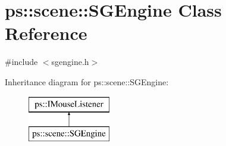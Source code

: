 \hypertarget{classps_1_1scene_1_1SGEngine}{}\section{ps\+:\+:scene\+:\+:S\+G\+Engine Class Reference}
\label{classps_1_1scene_1_1SGEngine}


{\ttfamily \#include $<$sgengine.\+h$>$}

Inheritance diagram for ps\+:\+:scene\+:\+:S\+G\+Engine\+:\begin{figure}[H]
\begin{center}
\leavevmode
\includegraphics[height=2.000000cm]{classps_1_1scene_1_1SGEngine}
\end{center}
\end{figure}
